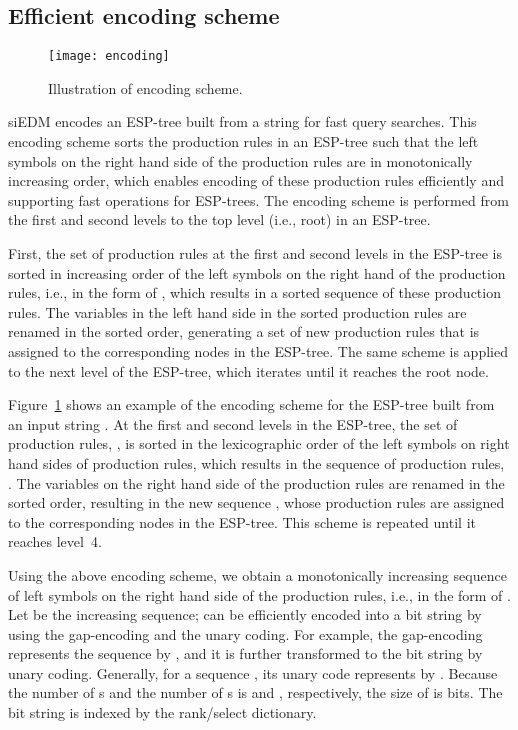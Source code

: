 \documentclass[12pt,a4paper]{scrartcl}
\begin{document}
\subsection{Efficient encoding scheme}

\begin{figure}
\texttt{[image: encoding]}
\caption{Illustration of encoding scheme.}
\label{fig:encoding}
\end{figure}

siEDM encodes an ESP-tree built from a string for fast query searches.
This encoding scheme sorts the production rules in an ESP-tree such
that the left symbols on the right hand side of the production rules
are in monotonically increasing order, which enables encoding of these
production rules efficiently and supporting fast operations for
ESP-trees.  The encoding scheme is performed from the first and second
levels to the top level (i.e., root) in an ESP-tree.

First, the set of production rules at the first and second levels in
the ESP-tree is sorted in increasing order of the left symbols on the
right hand of the production rules, i.e.,  in the form of
, which results in a sorted sequence of these
production rules.  The variables in the left hand side in the sorted
production rules are renamed in the sorted order, generating a set of
new production rules that is assigned to the corresponding nodes in
the ESP-tree.  The same scheme is applied to the next level of the
ESP-tree, which iterates until it reaches the root node.

Figure~\ref{fig:encoding} shows an example of the encoding scheme for
the ESP-tree built from an input string .  
At the first and second levels in the ESP-tree, the set of production rules,
, 
is sorted in the lexicographic order of the left symbols on right hand sides of production rules,
which results in the sequence of production rules,
.  The variables on
the right hand side of the production rules are renamed in the sorted
order, resulting in the new sequence
, whose production
rules are assigned to the corresponding nodes in the ESP-tree.  This
scheme is repeated until it reaches level~4.

Using the above encoding scheme, we obtain a monotonically increasing
sequence of left symbols on the right hand side of the production
rules, i.e.,  in the form of . Let  be the increasing sequence;  can
be efficiently encoded into a bit string by using the gap-encoding and
the unary coding.  For example, the gap-encoding represents the
sequence  by , and it is further transformed
to the bit string  by unary coding.
Generally, for a sequence , its unary code  represents
 by .
Because the number of s and the number of s is  and , respectively, 
the size of  is  bits.  
The bit string is indexed by the rank/select dictionary.
\end{document}
